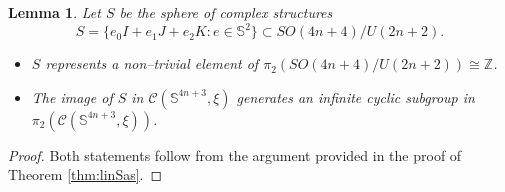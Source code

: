 \documentclass[10pt]{amsart}
\newtheorem{lemma}[proposition]{Lemma}
\begin{document}
\begin{lemma}\label{lem:acs} Let $S$ be the sphere of complex structures
$$S=\{e_0I+e_1J+e_2K:e\in{\mathbb{S}}^2\}\subset SO(4n+4)/U(2n+2).$$
\begin{itemize}
\item[1)] $S$ represents a non--trivial element of $\pi_2(SO(4n+4)/U(2n+2))\cong{\mathbb{Z}}$.
\item[2)] The image of $S$ in ${\mathcal{C}}({\mathbb{S}}^{4n+3},\xi)$ generates an infinite cyclic subgroup in $\pi_2({\mathcal{C}}({\mathbb{S}}^{4n+3},\xi))$.
\end{itemize}
\end{lemma}
\begin{proof}
Both statements follow from the argument provided in the proof of Theorem \ref{thm:linSas}.
\end{proof}
\end{document}
